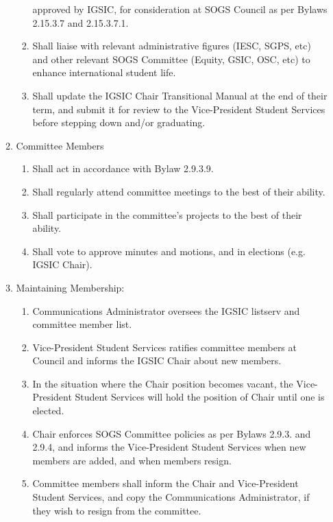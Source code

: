 \begin{enumerate}[label*=\arabic*., align=left]
\begin{enumerate}[label*=\arabic*., align=left]
\begin{enumerate}
approved by IGSIC, for consideration at SOGS Council as per Bylaws 2.15.3.7 and
2.15.3.7.1.
\item Shall liaise with relevant administrative figures (IESC, SGPS, etc) and other
relevant SOGS Committee (Equity, GSIC, OSC, etc) to enhance international
student life.
\item Shall update the IGSIC Chair Transitional Manual at the end of their term, and
submit it for review to the Vice-President Student Services before stepping down
and/or graduating.
\end{enumerate}
\item Committee Members
\begin{enumerate}
\item Shall act in accordance with Bylaw 2.9.3.9.
\item Shall regularly attend committee meetings to the best of their ability.
\item Shall participate in the committee's projects to the best of their ability.
\item Shall vote to approve minutes and motions, and in elections (e.g. IGSIC Chair).
\end{enumerate}
\item Maintaining Membership:
\begin{enumerate}
\item Communications Administrator oversees the IGSIC listserv and committee member list.
\item Vice-President Student Services ratifies committee members at Council and informs the IGSIC Chair about new members.
\item In the situation where the Chair position becomes vacant, the Vice-President Student Services will hold the position of Chair until one is elected.
\item Chair enforces SOGS Committee policies as per Bylaws 2.9.3. and 2.9.4, and informs the Vice-President Student Services when new members are added, and when members resign.
\item Committee members shall inform the Chair and Vice-President Student Services, and copy the
Communications Administrator, if they wish to resign from the committee.
\end{enumerate}
\end{enumerate}
\end{enumerate}

